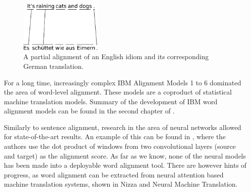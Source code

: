 \begin{figure}[ht]
  \centering
  \includegraphics[width=0.36\textwidth]{img/alignment/word_alignment_2_pdfa1a.pdf}
  \caption{\label{fig:word_alignment_2} A partial alignment of an English idiom and its corresponding German translation.}
\end{figure}

For a long time, increasingly complex IBM Alignment Models 1 to 6 dominated the area of word-level alignment.  These models are a coproduct of statistical machine translation models. Summary of the development of IBM word alignment models can be found in the second chapter of \cite{cuvrin_alignemnt:2006}.


Similarly to sentence alignment, research in the area of neural networks allowed for state-of-the-art results. An example of this can be found in \cite{legrand:2016}, where the authors use the dot product of windows from two convolutional layers (source and target) as the alignment score. As far as we know, none of the neural models has been made into a deployable word alignment tool. There are however hints of progress, as word alignment can be extracted from neural attention based machine translation systems, shown in Nizza and Neural Machine Translation.

